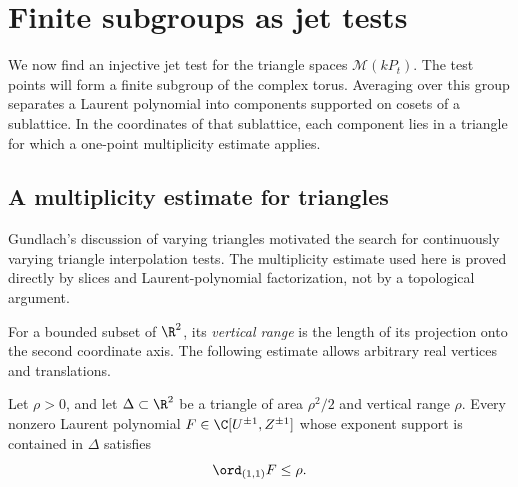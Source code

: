 \section{Finite subgroups as jet tests}\label{sec:lattice}

We now find an injective jet test for the triangle spaces
$\mathcal M(kP_t)$.  The test points will form a finite subgroup of the
complex torus.  Averaging over this group separates a Laurent polynomial
into components supported on cosets of a sublattice.  In the coordinates
of that sublattice, each component lies in a triangle for which a
one-point multiplicity estimate applies.

\subsection{A multiplicity estimate for triangles}

Gundlach's discussion of varying triangles
\cite[Section~6, Remark~28, Question~29, and Remark~30]{Gundlach2021}
motivated the search for continuously varying triangle interpolation
tests.  The multiplicity estimate used here is proved directly by slices
and Laurent-polynomial factorization, not by a topological argument.

For a bounded subset of $\R^2$, its \emph{vertical range} is the length of
its projection onto the second coordinate axis.  The following estimate
allows arbitrary real vertices and translations.

\begin{lemma}\label{lem:triangle-multiplicity}
Let $\rho>0$, and let $\Delta\subset\R^2$ be a triangle of area
$\rho^2/2$ and vertical range $\rho$.  Every nonzero Laurent polynomial
$F\in\C[U^{\pm1},Z^{\pm1}]$ whose exponent support is contained in
$\Delta$ satisfies
\[
 \ord_{(1,1)}F\leq\rho.
\]
\end{lemma}




